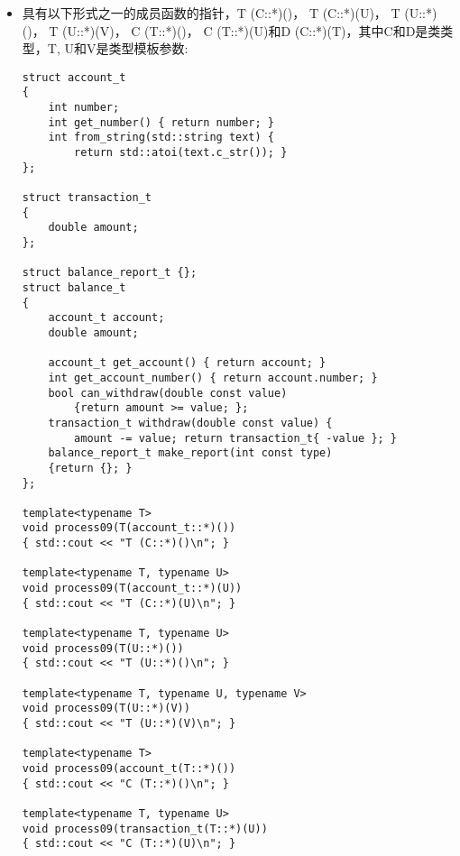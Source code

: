 \begin{itemize}
\begin{lstlisting}[style=styleCXX]
template<typename T>
void process08(T(*)()) { std::cout << "T (*)()\n"; }

template<typename T>
void process08(account_t(*)(T))
{ std::cout << "C (*) (T)\n"; }

template<typename T, typename U>
void process08(T(*)(U)) { std::cout << "T (*)(U)\n"; }

int main()
{
	account_t (*pf1)() = nullptr;
	account_t (*pf2)(int) = nullptr;
	double (*pf3)(int) = nullptr;
	
	process08(pf1); // T (*)()
	process08(pf2); // C (*)(T)
	process08(pf3); // T (*)(U)
}
\end{lstlisting}

\item
具有以下形式之一的成员函数的指针，T (C::*)()， T (C::*)(U)， T (U::*)()， T (U::*)(V)， C (T::*)()， C (T::*)(U)和D (C::*)(T)，其中C和D是类类型，T, U和V是类型模板参数:

\begin{lstlisting}[style=styleCXX]
struct account_t
{
	int number;
	int get_number() { return number; }
	int from_string(std::string text) {
		return std::atoi(text.c_str()); }
};

struct transaction_t
{
	double amount;
};

struct balance_report_t {};
struct balance_t
{
	account_t account;
	double amount;
	
	account_t get_account() { return account; }
	int get_account_number() { return account.number; }
	bool can_withdraw(double const value)
		{return amount >= value; };
	transaction_t withdraw(double const value) {
		amount -= value; return transaction_t{ -value }; }
	balance_report_t make_report(int const type)
	{return {}; }
};

template<typename T>
void process09(T(account_t::*)())
{ std::cout << "T (C::*)()\n"; }

template<typename T, typename U>
void process09(T(account_t::*)(U))
{ std::cout << "T (C::*)(U)\n"; }

template<typename T, typename U>
void process09(T(U::*)())
{ std::cout << "T (U::*)()\n"; }

template<typename T, typename U, typename V>
void process09(T(U::*)(V))
{ std::cout << "T (U::*)(V)\n"; }

template<typename T>
void process09(account_t(T::*)())
{ std::cout << "C (T::*)()\n"; }

template<typename T, typename U>
void process09(transaction_t(T::*)(U))
{ std::cout << "C (T::*)(U)\n"; }


\end{lstlisting}
\end{itemize}
